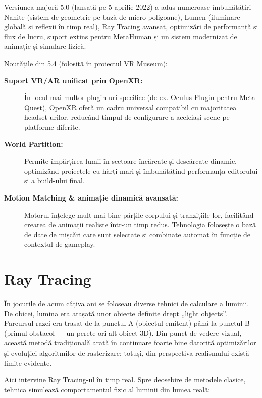 Versiunea majoră 5.0 (lansată pe 5 aprilie 2022) a adus numeroase îmbunătățiri - Nanite (sistem de geometrie pe bază de micro-poligoane), Lumen (iluminare globală și reflexii în timp real), Ray Tracing avansat, optimizări de performanță și flux de lucru, suport extins pentru MetaHuman și un sistem modernizat de animație și simulare fizică.

Noutățile din 5.4 (folosită în proiectul VR Museum):

\begin{adjustwidth}{2em}{0pt}
\begin{description}
    \item[\textbf{Suport VR/AR unificat prin OpenXR: }] În locul mai multor plugin-uri specifice (de ex. Oculus Plugin pentru Meta Quest), OpenXR oferă un cadru universal compatibil cu majoritatea headset-urilor, reducând timpul de configurare a aceleiași scene pe platforme diferite.
    \item[\textbf{{World Partition: }}] Permite împărțirea lumii în sectoare încărcate și descărcate dinamic, optimizând proiectele cu hărți mari și îmbunătățind performanța editorului și a build-ului final.
    \item[\textbf{{Motion Matching \& animație dinamică avansată: }}] Motorul înțelege mult mai bine părțile corpului și tranzițiile lor, facilitând crearea de animații realiste într-un timp redus. Tehnologia folosește o bază de date de mișcări care sunt selectate și combinate automat în funcție de contextul de gameplay.
\end{description}
\end{adjustwidth}

\section{Ray Tracing}

În jocurile de acum câțiva ani se foloseau diverse tehnici de calculare a luminii. De obicei, lumina era atașată unor obiecte definite drept „light objects”. Parcursul razei era trasat de la punctul A (obiectul emitent) până la punctul B (primul obstacol — un perete ori alt obiect 3D). Din punct de vedere vizual, această metodă tradițională arată în continuare foarte bine datorită optimizărilor și evoluției algoritmilor de rasterizare; totuși, din perspectiva realismului există limite evidente.

Aici intervine Ray Tracing-ul în timp real. Spre deosebire de metodele clasice, tehnica simulează comportamentul fizic al luminii din lumea reală:

